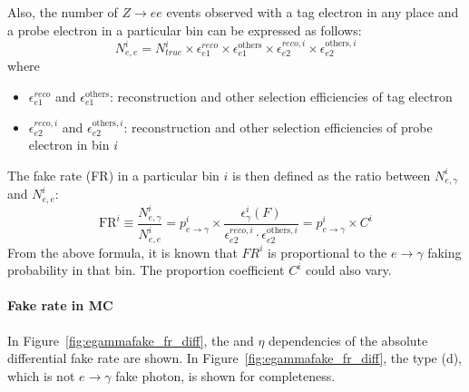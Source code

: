 Also, the number of $Z\to ee$ events observed with a tag electron in any place and a probe electron in a particular bin can be expressed as follows:
\begin{equation}
N_{e,e}^i = N_{true}^i \times \epsilon_{e1}^{reco} \times \epsilon_{e1}^{\mathrm{others}} \times \epsilon_{e2}^{reco,i} \times \epsilon_{e2}^{\mathrm{others},i}
\end{equation}
where
\begin{itemize}
\item $\epsilon_{e1}^{reco}$ and $\epsilon_{e1}^{\mathrm{others}}$: reconstruction and other selection efficiencies of tag electron
\item $\epsilon_{e2}^{reco,i}$ and $\epsilon_{e2}^{\mathrm{others},i}$: reconstruction and other selection efficiencies of probe electron in bin $i$
\end{itemize}

The fake rate (FR) in a particular bin $i$ is then defined as the ratio between $N_{e,\gamma}^i$ and $N_{e,e}^i$:
\begin{equation}
\text{FR}^i \equiv \frac{N_{e,\gamma}^i}{N_{e,e}^i} = p_{e\to\gamma}^i \times \frac{\epsilon_{\gamma}^i(F)}{\epsilon_{e2}^{reco,i} \cdot \epsilon_{e2}^{\mathrm{others},i}} = p_{e\to\gamma}^i \times C^i
\end{equation}
From the above formula, it is known that $FR^i$ is proportional to the $e\to\gamma$ faking probability in that bin. The proportion coefficient $C^i$ could also vary.

\paragraph*{Fake rate in MC}
In Figure~\ref{fig:egammafake_fr_diff}, the \pt and $\eta$ dependencies of the absolute differential fake rate are shown. In Figure~\ref{fig:egammafake_fr_diff}, the type (d), which is not $e\rightarrow \gamma$ fake photon, is shown for completeness.

